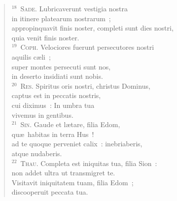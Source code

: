 \begin{flushleft}
\begin{verse}
${}^{18}$~\textsc{Sade.} Lubricaverunt vestigia nostra\\ in itinere platearum nostrarum~;\\ appropinquavit finis noster, completi sunt dies nostri,\\ quia venit finis noster.\\
${}^{19}$~\textsc{Coph.} Velociores fuerunt persecutores nostri\\ aquilis c\ae li~;\\ super montes persecuti sunt nos,\\ in deserto insidiati sunt nobis.\\
${}^{20}$~\textsc{Res.} Spiritus oris nostri, christus Dominus,\\ captus est in peccatis nostris,\\ cui diximus~: In umbra tua\\ vivemus in gentibus.\\
${}^{21}$~\textsc{Sin.} Gaude et l\ae tare, filia Edom,\\ qu\ae\ habitas in terra Hus~!\\ ad te quoque perveniet calix~: inebriaberis,\\ atque nudaberis.\\
${}^{22}$~\textsc{Thau.} Completa est iniquitas tua, filia Sion~:\\ non addet ultra ut transmigret te.\\ Visitavit iniquitatem tuam, filia Edom~;\\ discooperuit peccata tua.\end{verse}\end{flushleft}


